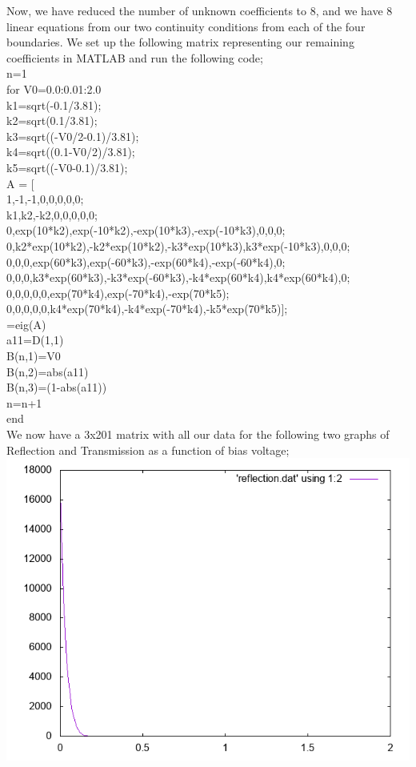 \documentclass{article}
\begin{document}
Now, we have reduced the number of unknown coefficients to 8, and we have 8 linear equations from our two continuity conditions from each of the four boundaries. We set up the following matrix representing our remaining coefficients in MATLAB and run the following code;\\
n=1\\
for V0=0.0:0.01:2.0\\
k1=sqrt(-0.1/3.81);\\
k2=sqrt(0.1/3.81);\\
k3=sqrt((-V0/2-0.1)/3.81);\\
k4=sqrt((0.1-V0/2)/3.81);\\
k5=sqrt((-V0-0.1)/3.81);\\
A = [\\
1,-1,-1,0,0,0,0,0;\\
k1,k2,-k2,0,0,0,0,0;\\
0,exp(10*k2),exp(-10*k2),-exp(10*k3),-exp(-10*k3),0,0,0;\\
0,k2*exp(10*k2),-k2*exp(10*k2),-k3*exp(10*k3),k3*exp(-10*k3),0,0,0;\\
0,0,0,exp(60*k3),exp(-60*k3),-exp(60*k4),-exp(-60*k4),0;\\
0,0,0,k3*exp(60*k3),-k3*exp(-60*k3),-k4*exp(60*k4),k4*exp(60*k4),0;\\
0,0,0,0,0,exp(70*k4),exp(-70*k4),-exp(70*k5);\\
0,0,0,0,0,k4*exp(70*k4),-k4*exp(-70*k4),-k5*exp(70*k5)];\\
[V,D]=eig(A)\\
a11=D(1,1)\\
B(n,1)=V0\\
B(n,2)=abs(a11)\\
B(n,3)=(1-abs(a11))\\
n=n+1\\
end\\

We now have a 3x201 matrix with all our data for the following two graphs of Reflection and Transmission as a function of bias voltage;\\

\includegraphics[width=\textwidth]{reflection.png}
\end{document}
